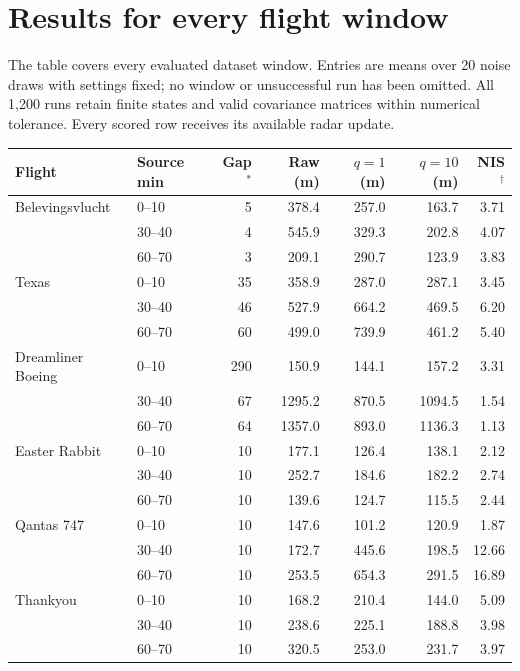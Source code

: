 \documentclass[12pt,a4paper]{article}
\begin{document}
\section{Results for every flight window}
The table covers every evaluated dataset window. Entries are means over 20 noise draws with settings fixed; no window or unsuccessful run has been omitted. All 1,200 runs retain finite states and valid covariance matrices within numerical tolerance. Every scored row receives its available radar update.
\begin{table}[H]\centering\footnotesize
\setlength{\tabcolsep}{3.5pt}
\renewcommand{\arraystretch}{1.02}
\begin{tabular}{llrrrrr}\toprule
Flight & Source min & Gap$^*$ & Raw (m) & $q=1$ (m) & $q=10$ (m) & NIS$^\dagger$\\\midrule
Belevingsvlucht & 0--10 & 5 & 378.4 & 257.0 & 163.7 & 3.71 \\
 & 30--40 & 4 & 545.9 & 329.3 & 202.8 & 4.07 \\
 & 60--70 & 3 & 209.1 & 290.7 & 123.9 & 3.83 \\
\addlinespace[2pt]
Texas & 0--10 & 35 & 358.9 & 287.0 & 287.1 & 3.45 \\
 & 30--40 & 46 & 527.9 & 664.2 & 469.5 & 6.20 \\
 & 60--70 & 60 & 499.0 & 739.9 & 461.2 & 5.40 \\
\addlinespace[2pt]
Dreamliner Boeing & 0--10 & 290 & 150.9 & 144.1 & 157.2 & 3.31 \\
 & 30--40 & 67 & 1295.2 & 870.5 & 1094.5 & 1.54 \\
 & 60--70 & 64 & 1357.0 & 893.0 & 1136.3 & 1.13 \\
\addlinespace[2pt]
Easter Rabbit & 0--10 & 10 & 177.1 & 126.4 & 138.1 & 2.12 \\
 & 30--40 & 10 & 252.7 & 184.6 & 182.2 & 2.74 \\
 & 60--70 & 10 & 139.6 & 124.7 & 115.5 & 2.44 \\
\addlinespace[2pt]
Qantas 747 & 0--10 & 10 & 147.6 & 101.2 & 120.9 & 1.87 \\
 & 30--40 & 10 & 172.7 & 445.6 & 198.5 & 12.66 \\
 & 60--70 & 10 & 253.5 & 654.3 & 291.5 & 16.89 \\
\addlinespace[2pt]
Thankyou & 0--10 & 10 & 168.2 & 210.4 & 144.0 & 5.09 \\
 & 30--40 & 10 & 238.6 & 225.1 & 188.8 & 3.98 \\
 & 60--70 & 10 & 320.5 & 253.0 & 231.7 & 3.97 \\

\end{tabular}
\end{table}
\end{document}
